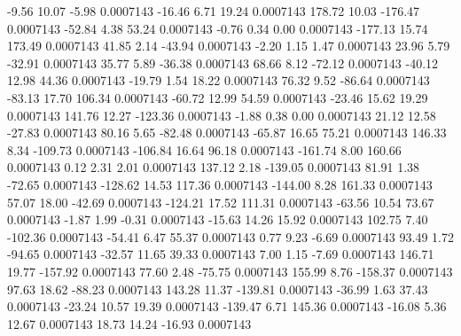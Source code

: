        -9.56       10.07       -5.98     0.0007143
      -16.46        6.71       19.24     0.0007143
      178.72       10.03     -176.47     0.0007143
      -52.84        4.38       53.24     0.0007143
       -0.76        0.34        0.00     0.0007143
     -177.13       15.74      173.49     0.0007143
       41.85        2.14      -43.94     0.0007143
       -2.20        1.15        1.47     0.0007143
       23.96        5.79      -32.91     0.0007143
       35.77        5.89      -36.38     0.0007143
       68.66        8.12      -72.12     0.0007143
      -40.12       12.98       44.36     0.0007143
      -19.79        1.54       18.22     0.0007143
       76.32        9.52      -86.64     0.0007143
      -83.13       17.70      106.34     0.0007143
      -60.72       12.99       54.59     0.0007143
      -23.46       15.62       19.29     0.0007143
      141.76       12.27     -123.36     0.0007143
       -1.88        0.38        0.00     0.0007143
       21.12       12.58      -27.83     0.0007143
       80.16        5.65      -82.48     0.0007143
      -65.87       16.65       75.21     0.0007143
      146.33        8.34     -109.73     0.0007143
     -106.84       16.64       96.18     0.0007143
     -161.74        8.00      160.66     0.0007143
        0.12        2.31        2.01     0.0007143
      137.12        2.18     -139.05     0.0007143
       81.91        1.38      -72.65     0.0007143
     -128.62       14.53      117.36     0.0007143
     -144.00        8.28      161.33     0.0007143
       57.07       18.00      -42.69     0.0007143
     -124.21       17.52      111.31     0.0007143
      -63.56       10.54       73.67     0.0007143
       -1.87        1.99       -0.31     0.0007143
      -15.63       14.26       15.92     0.0007143
      102.75        7.40     -102.36     0.0007143
      -54.41        6.47       55.37     0.0007143
        0.77        9.23       -6.69     0.0007143
       93.49        1.72      -94.65     0.0007143
      -32.57       11.65       39.33     0.0007143
        7.00        1.15       -7.69     0.0007143
      146.71       19.77     -157.92     0.0007143
       77.60        2.48      -75.75     0.0007143
      155.99        8.76     -158.37     0.0007143
       97.63       18.62      -88.23     0.0007143
      143.28       11.37     -139.81     0.0007143
      -36.99        1.63       37.43     0.0007143
      -23.24       10.57       19.39     0.0007143
     -139.47        6.71      145.36     0.0007143
      -16.08        5.36       12.67     0.0007143
       18.73       14.24      -16.93     0.0007143

